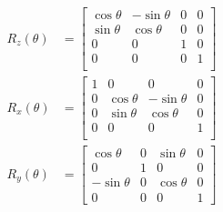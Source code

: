 \documentclass{article}
\begin{document}
\begin{align*}
	R_z(\theta) &= 
	\begin{bmatrix}
		\cos\theta & -\sin\theta & 0 & 0 \\
		\sin\theta & \cos\theta & 0 & 0 \\
		0 & 0 & 1 & 0 \\
		0 & 0 & 0 & 1 \\
	\end{bmatrix} \\
	R_x(\theta) &= 
	\begin{bmatrix}
		1 & 0 & 0 & 0 \\
		0 & \cos\theta & -\sin\theta & 0 \\
		0 & \sin\theta & \cos\theta & 0 \\
		0 & 0 & 0 & 1 \\
	\end{bmatrix} \\
	R_y(\theta) &=
	\begin{bmatrix}
		\cos\theta & 0 & \sin\theta & 0 \\
		0 & 1 & 0 & 0 \\
		-\sin\theta & 0 & \cos\theta & 0 \\
		0 & 0 & 0 & 1
	\end{bmatrix}
\end{align*}
\end{document}
